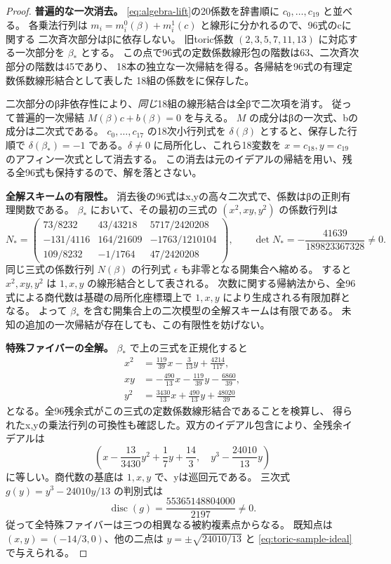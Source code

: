 \documentclass[11pt,a4paper]{ltjsarticle}
\theoremstyle{remark}
\begin{document}
\begin{proof}
\textbf{普遍的な一次消去。}
\eqref{eq:algebra-lift}の20係数を辞書順に $c_0,\ldots,c_{19}$ と並べる。
各乗法行列は $m_i=m_i^0(\beta)+m_i^1(c)$ と線形に分かれるので、96式のcに関する
二次斉次部分はβに依存しない。
旧toric係数 $(2,3,5,7,11,13)$ に対応する一次部分を $\beta_*$ とする。
この点で96式の定数係数線形包の階数は63、二次斉次部分の階数は45であり、
18本の独立な一次帰結を得る。各帰結を96式の有理定数係数線形結合として表した
18組の係数を\cite{degree-certificate}に保存した。

二次部分のβ非依存性により、\emph{同じ}18組の線形結合は全βで二次項を消す。
従って普遍的一次帰結 $M(\beta)c+b(\beta)=0$ を与える。
$M$ の成分はβの一次式、bの成分は二次式である。
$c_0,\ldots,c_{17}$ の18次小行列式を $\delta(\beta)$ とすると、保存した行順で
$\delta(\beta_*)=-1$ である。$\delta\ne0$ に局所化し、これら18変数を
$x=c_{18},y=c_{19}$ のアフィン一次式として消去する。
この消去は元のイデアルの帰結を用い、残る全96式も保持するので、解を落とさない。

\textbf{全解スキームの有限性。}
消去後の96式はx,yの高々二次式で、係数はβの正則有理関数である。
$\beta_*$ において、その最初の三式の $(x^2,xy,y^2)$ の係数行列は
\[
 N_*=
 \begin{pmatrix}
 73/8232&43/43218&5717/2420208\\
 -131/4116&164/21609&-1763/1210104\\
 109/8232&-1/1764&47/2420208
 \end{pmatrix},\qquad
 \det N_*=-\frac{41639}{189823367328}\ne0.
\]
同じ三式の係数行列 $N(\beta)$ の行列式 $\epsilon$ も非零となる開集合へ縮める。
すると $x^2,xy,y^2$ は $1,x,y$ の線形結合として表される。
次数に関する帰納法から、全96式による商代数は基礎の局所化座標環上で
$1,x,y$ により生成される有限加群となる。
よって $\beta_*$ を含む開集合上の二次模型の全解スキームは有限である。
未知の追加の一次帰結が存在しても、この有限性を妨げない。

\textbf{特殊ファイバーの全解。}
$\beta_*$ で上の三式を正規化すると
\begin{align*}
 x^2&=\tfrac{119}{39}x-\tfrac3{13}y+\tfrac{4214}{117},\\
 xy&=-\tfrac{490}{13}x-\tfrac{119}{39}y-\tfrac{6860}{39},\\
 y^2&=\tfrac{3430}{13}x+\tfrac{490}{13}y+\tfrac{48020}{39}
\end{align*}
となる。全96残余式がこの三式の定数係数線形結合であることを検算し、
得られたx,yの乗法行列の可換性も確認した。双方のイデアル包含により、全残余イデアルは
\begin{equation}\label{eq:toric-sample-ideal}
 \left(x-\frac{13}{3430}y^2+\frac17y+\frac{14}3,
       \quad y^3-\frac{24010}{13}y\right)
\end{equation}
に等しい。商代数の基底は $1,x,y$ で、yは巡回元である。
三次式 $g(y)=y^3-24010y/13$ の判別式は
\[
 \operatorname{disc}(g)=\frac{55365148804000}{2197}\ne0.
\]
従って全特殊ファイバーは三つの相異なる被約複素点からなる。
既知点は $(x,y)=(-14/3,0)$、他の二点は $y=\pm\sqrt{24010/13}$ と
\eqref{eq:toric-sample-ideal}で与えられる。


\end{proof}
\end{document}

